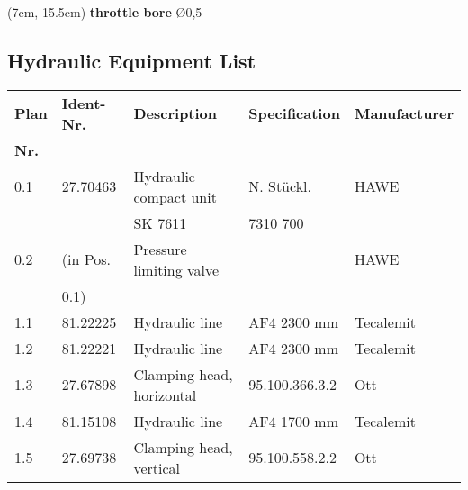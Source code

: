 \begin{textblock*}{\textwidth}(7cm, 15.5cm)
    \textbf{throttle bore} \O0,5
\end{textblock*}

\subsection{Hydraulic Equipment List}

\begin{table}[h]
    \centering
    \begin{tabularx}{\textwidth}{|l|l|l|l|l|}
        \hline
        \textbf{Plan}   & \textbf{Ident-Nr.}    & \textbf{Description}      & \textbf{Specification}    & \textbf{Manufacturer} \\
        \textbf{Nr.}    &                       &                           &                           &                       \\
        \hline
        \hline
        0.1             & 27.70463              & Hydraulic compact unit     & N. Stückl.               & HAWE                  \\
                        &                       & SK 7611                    & 7310 700                 &                       \\
        0.2             & (in Pos.              & Pressure limiting valve    &                          & HAWE                  \\
                        & 0.1)                  &                            &                          &                       \\
        1.1             & 81.22225              & Hydraulic line             & AF4 2300 mm              & Tecalemit             \\
        1.2             & 81.22221              & Hydraulic line             & AF4 2300 mm              & Tecalemit             \\
        1.3             & 27.67898              & Clamping head, horizontal  & 95.100.366.3.2           & Ott                   \\
        1.4             & 81.15108              & Hydraulic line             & AF4 1700 mm              & Tecalemit             \\
        1.5             & 27.69738              & Clamping head, vertical    & 95.100.558.2.2           & Ott                   \\
        \hline
    \end{tabularx}
    \label{tab:hydraulic_list}
\end{table}

